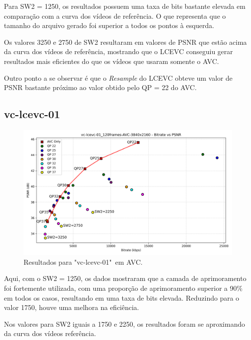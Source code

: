 Para SW2 = 1250, os resultados possuem uma taxa de bits bastante elevada em comparação com 
a curva dos vídeos de referência. O que representa que o tamanho do arquivo gerado foi superior
a todos os pontos à esquerda.

Os valores 3250 e 2750 de SW2 resultaram em valores de \acrshort{PSNR} que estão acima da curva
dos vídeos de referência, mostrando que o \acrshort{LCEVC} conseguiu gerar resultados mais
eficientes do que os vídeos que usaram somente o \acrshort{AVC}.

Outro ponto a se observar é que o \textit{Resample} do \acrshort{LCEVC} obteve um valor de 
\acrshort{PSNR} bastante próximo ao valor obtido pelo QP = 22 do \acrshort{AVC}.


\newpage

\subsection{vc-lcevc-01}

\begin{figure}[h]
    \centering
    \includegraphics[width=1.0\textwidth]{img/vc-lcevc-01_120frames-AVC.png}
    \caption{Resultados para "vc-lcevc-01"\ em \acrshort{AVC}.}
    \label{fig:vc-lcevc-01}
\end{figure}

Aqui, com o SW2 = 1250, os dados mostraram que a camada de aprimoramento foi fortemente
utilizada, com uma proporção de aprimoramento superior a 90\% em todos os casos, resultando
em uma taxa de bits elevada. Reduzindo para o valor 1750, houve uma melhora na eficiência.

Nos valores para SW2 iguais a 1750 e 2250, os resultados foram se aproximando da curva dos
vídeos referência.

